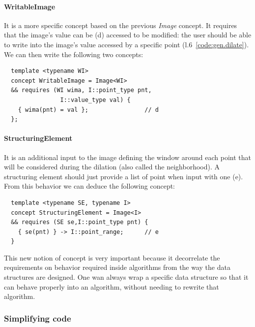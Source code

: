 \paragraph{WritableImage} It is a more specific concept based on the previous \emph{Image} concept. It requires that the
image's value can be (d) accessed to be modified: the user should be able to write into the image's value accessed by a
specific point (l.6~\cref{code:gen.dilate}). We can then write the following two concepts:
\begin{verbatim}
  template <typename WI>
  concept WritableImage = Image<WI>
  && requires (WI wima, I::point_type pnt,
                I::value_type val) {
    { wima(pnt) = val };                // d
  };
\end{verbatim}

\paragraph{StructuringElement} It is an additional input to the image defining the window around each point that will be
considered during the dilation (also called the neighborhood). A structuring element should just provide a list of point
when input with one (e). From this behavior we can deduce the following concept:
\begin{verbatim}
  template <typename SE, typename I>
  concept StructuringElement = Image<I>
  && requires (SE se,I::point_type pnt) {
    { se(pnt) } -> I::point_range;      // e
  }
\end{verbatim}

This new notion of concept is very important because it decorrelate the requirements on behavior required inside
algorithms from the way the data structures are designed. One wan always wrap a specific data structure so that it can
behave properly into an algorithm, without needing to rewrite that algorithm.

\subsubsection{Simplifying code}
\label{subsec:simplifying}

